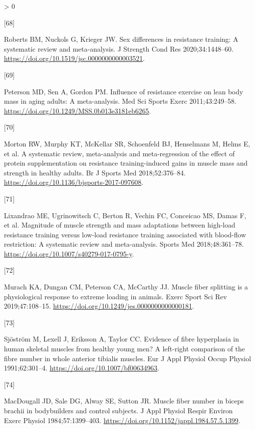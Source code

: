 \documentclass[twoside,10pt]{gihclass} %
\newlength{\cslhangindent}
\newlength{\csllabelwidth}
\newenvironment{CSLReferences}[3] %
 {%
  \setlength{\parindent}{0pt}
  \ifodd #1 \everypar{\setlength{\hangindent}{\cslhangindent}}\ignorespaces\fi
  \ifnum #2 > 0
  \setlength{\parskip}{#2\baselineskip}
  \fi
 }%
 {}
\newcommand{\CSLLeftMargin}[1]{\parbox[t]{\maxof{\widthof{#1}}{\csllabelwidth}}{#1}}
\newcommand{\CSLRightInline}[1]{\parbox[t]{\linewidth}{#1}}
\begin{document}
\begin{CSLReferences}{0}{0}
\leavevmode\hypertarget{ref-RN2740}{}%
\CSLLeftMargin{{[}68{]} }
\CSLRightInline{Roberts BM, Nuckols G, Krieger JW. Sex differences in resistance training: A systematic review and meta-analysis. J Strength Cond Res 2020;34:1448--60. \url{https://doi.org/10.1519/jsc.0000000000003521}.}

\leavevmode\hypertarget{ref-RN752}{}%
\CSLLeftMargin{{[}69{]} }
\CSLRightInline{Peterson MD, Sen A, Gordon PM. Influence of resistance exercise on lean body mass in aging adults: A meta-analysis. Med Sci Sports Exerc 2011;43:249--58. \url{https://doi.org/10.1249/MSS.0b013e3181eb6265}.}

\leavevmode\hypertarget{ref-RN2199}{}%
\CSLLeftMargin{{[}70{]} }
\CSLRightInline{Morton RW, Murphy KT, McKellar SR, Schoenfeld BJ, Henselmans M, Helms E, et al. A systematic review, meta-analysis and meta-regression of the effect of protein supplementation on resistance training-induced gains in muscle mass and strength in healthy adults. Br J Sports Med 2018;52:376--84. \url{https://doi.org/10.1136/bjsports-2017-097608}.}

\leavevmode\hypertarget{ref-RN2745}{}%
\CSLLeftMargin{{[}71{]} }
\CSLRightInline{Lixandrao ME, Ugrinowitsch C, Berton R, Vechin FC, Conceicao MS, Damas F, et al. Magnitude of muscle strength and mass adaptations between high-load resistance training versus low-load resistance training associated with blood-flow restriction: A systematic review and meta-analysis. Sports Med 2018;48:361--78. \url{https://doi.org/10.1007/s40279-017-0795-y}.}

\leavevmode\hypertarget{ref-RN2741}{}%
\CSLLeftMargin{{[}72{]} }
\CSLRightInline{Murach KA, Dungan CM, Peterson CA, McCarthy JJ. Muscle fiber splitting is a physiological response to extreme loading in animals. Exerc Sport Sci Rev 2019;47:108--15. \url{https://doi.org/10.1249/jes.0000000000000181}.}

\leavevmode\hypertarget{ref-RN2742}{}%
\CSLLeftMargin{{[}73{]} }
\CSLRightInline{Sjöström M, Lexell J, Eriksson A, Taylor CC. Evidence of fibre hyperplasia in human skeletal muscles from healthy young men? A left-right comparison of the fibre number in whole anterior tibialis muscles. Eur J Appl Physiol Occup Physiol 1991;62:301--4. \url{https://doi.org/10.1007/bf00634963}.}

\leavevmode\hypertarget{ref-RN2754}{}%
\CSLLeftMargin{{[}74{]} }
\CSLRightInline{MacDougall JD, Sale DG, Alway SE, Sutton JR. Muscle fiber number in biceps brachii in bodybuilders and control subjects. J Appl Physiol Respir Environ Exerc Physiol 1984;57:1399--403. \url{https://doi.org/10.1152/jappl.1984.57.5.1399}.}


\end{CSLReferences}
\end{document}
